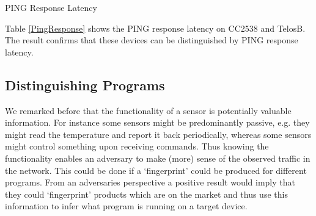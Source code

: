 \documentclass{article}
\begin{document}
\begin{table}
	\center
	
	\caption{PING Response Latency\label{PingResponse}}
\end{table}

Table \ref{PingResponse} shows the PING response latency on CC2538 and TelosB. The result confirms that these devices can be distinguished by PING response latency.


\subsection{Distinguishing Programs}

We remarked before that the functionality of a sensor is potentially valuable information. For instance some sensors might be predominantly passive, e.g. they might read the temperature and report it back periodically, whereas some sensors might control something upon receiving commands. Thus knowing the functionality enables an adversary to make (more) sense of the observed traffic in the network. This could be done if a `fingerprint' could be produced for different programs. From an adversaries perspective a positive result would imply that they could `fingerprint' products which are on the market and thus use this information to infer what program is running on a target device.


\end{document}
